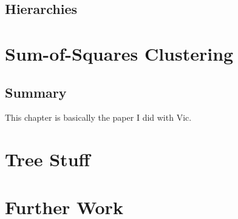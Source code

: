 \documentclass[a4paper]{report}
\begin{document}
\section{Hierarchies}
\label{sec:hierarchies}



\chapter{Sum-of-Squares Clustering}
\label{cha:sum-squar-clust}

\section{Summary}
\label{sec:summary-sum-squar}

This chapter is basically the paper I did with Vic.

\chapter{Tree Stuff}
\label{cha:tree-stuff}

\chapter{Further Work}
\label{cha:further-work}





\end{document}
